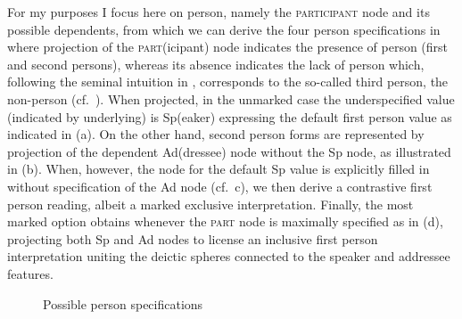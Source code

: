 \documentclass[output=paper]{langsci/langscibook}
\begin{document}
For my purposes I focus here on person, namely the \textsc{participant} node
and its possible dependents, from which we can derive the four person
specifications in  where projection of the
\textsc{part}(icipant) node indicates the presence of person
(first and second persons), whereas its absence
indicates the lack of person which, following the seminal intuition in
\citet{Benveniste:1956a}, corresponds to the so-called third
person, the non-person (cf.\ \citealt[488]{HarRit2002}). When projected, in
the unmarked case the underspecified value (indicated by underlying) is
Sp(eaker) expressing the default first person value as
indicated in (a). On the other hand, second person forms are
represented by projection of the dependent Ad(dressee) node without the Sp
node, as illustrated in (b). When, however, the node for the default Sp value
is explicitly filled in without specification of the Ad node (cf.\ c), we then
derive a contrastive first person reading, albeit a marked exclusive
interpretation. Finally, the most marked option obtains whenever the
\textsc{part} node is maximally specified as in (d), projecting both Sp and Ad
nodes to license an inclusive first person interpretation uniting the deictic
spheres connected to the speaker and addressee features.

\begin{figure}
    \caption{Possible person specifications}\label{fig:3}


\end{figure}
\end{document}
